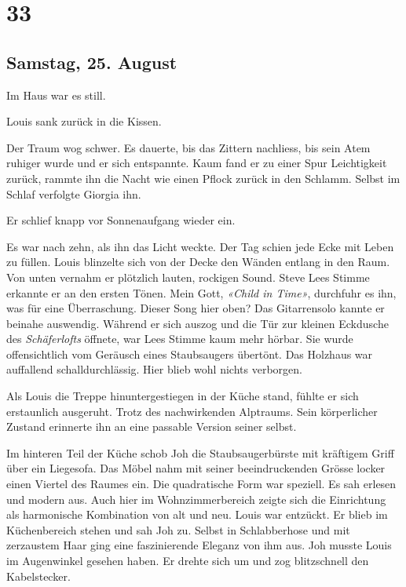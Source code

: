 \chapter{33}

\section{Samstag, 25. August}



Im Haus war es still.

Louis sank zurück in die Kissen.

Der Traum wog schwer. Es dauerte, bis das Zittern nachliess, bis sein
Atem ruhiger wurde und er sich entspannte. Kaum fand
er zu einer Spur Leichtigkeit zurück, rammte ihn die Nacht wie einen
Pflock zurück in den Schlamm. Selbst im Schlaf verfolgte Giorgia ihn. 

Er schlief knapp vor Sonnenaufgang wieder ein.

\sectionbreak

Es war nach zehn, als ihn das Licht weckte. Der Tag schien jede Ecke mit Leben zu füllen. Louis blinzelte sich von
der Decke den Wänden entlang in den Raum. Von unten vernahm er plötzlich
lauten, rockigen Sound. Steve Lees Stimme erkannte er an den ersten
Tönen. Mein Gott, \emph{«Child in Time»}, durchfuhr es ihn, was für
eine Überraschung. Dieser Song hier oben? Das
Gitarrensolo kannte er beinahe auswendig. Während er sich auszog und die
Tür zur kleinen Eckdusche des \emph{Schäferlofts} öffnete, war Lees
Stimme kaum mehr hörbar. Sie wurde offensichtlich vom Geräusch eines
Staubsaugers übertönt. Das Holzhaus war auffallend schalldurchlässig.
Hier blieb wohl nichts verborgen. 


Als Louis die Treppe hinuntergestiegen in der Küche stand, fühlte er
sich erstaunlich ausgeruht. Trotz des nachwirkenden Alptraums. Sein
körperlicher Zustand erinnerte ihn an eine passable Version seiner
selbst.

Im hinteren Teil der Küche schob Joh die Staubsaugerbürste mit kräftigem
Griff über ein Liegesofa. Das Möbel nahm mit seiner beeindruckenden Grösse
locker einen Viertel des Raumes ein. Die quadratische Form war speziell.
Es sah erlesen und modern aus. Auch hier im
Wohnzimmerbereich zeigte sich die Einrichtung als harmonische
Kombination von alt und neu. Louis war entzückt. 
Er blieb im Küchenbereich stehen und sah Joh zu. Selbst in Schlabberhose und mit
zerzaustem Haar ging eine faszinierende Eleganz von ihm aus.
Joh musste Louis im Augenwinkel gesehen haben. Er drehte sich um und zog
blitzschnell den Kabelstecker.

